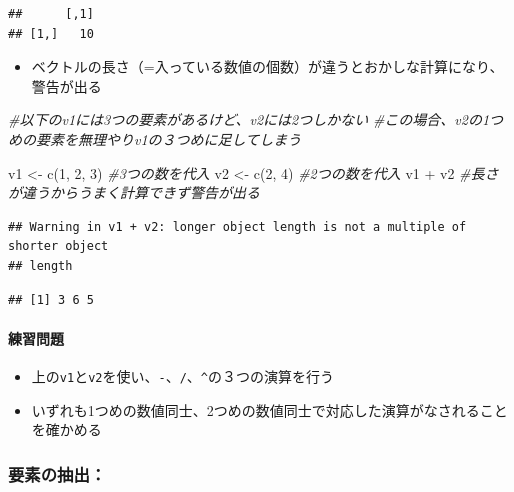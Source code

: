\documentclass[
]{book}
\newenvironment{Shaded}{\begin{snugshade}}{\end{snugshade}}
\newcommand{\CommentTok}[1]{\textcolor[rgb]{0.56,0.35,0.01}{\textit{#1}}}
\newcommand{\DecValTok}[1]{\textcolor[rgb]{0.00,0.00,0.81}{#1}}
\newcommand{\FunctionTok}[1]{\textcolor[rgb]{0.00,0.00,0.00}{#1}}
\newcommand{\NormalTok}[1]{#1}
\newcommand{\OtherTok}[1]{\textcolor[rgb]{0.56,0.35,0.01}{#1}}
\newcommand{\SpecialCharTok}[1]{\textcolor[rgb]{0.00,0.00,0.00}{#1}}
\providecommand{\tightlist}{%
  \setlength{\itemsep}{0pt}\setlength{\parskip}{0pt}}
\begin{document}
\begin{verbatim}
##      [,1]
## [1,]   10
\end{verbatim}

\begin{itemize}
\tightlist
\item
  ベクトルの長さ（=入っている数値の個数）が違うとおかしな計算になり、警告が出る
\end{itemize}

\begin{Shaded}
\begin{Highlighting}[]
\CommentTok{\#以下のv1には3つの要素があるけど、v2には2つしかない}
\CommentTok{\#この場合、v2の1つめの要素を無理やりv1の３つめに足してしまう}

\NormalTok{v1 }\OtherTok{\textless{}{-}} \FunctionTok{c}\NormalTok{(}\DecValTok{1}\NormalTok{, }\DecValTok{2}\NormalTok{, }\DecValTok{3}\NormalTok{)  }\CommentTok{\#3つの数を代入}
\NormalTok{v2 }\OtherTok{\textless{}{-}} \FunctionTok{c}\NormalTok{(}\DecValTok{2}\NormalTok{, }\DecValTok{4}\NormalTok{) }\CommentTok{\#2つの数を代入}
\NormalTok{v1 }\SpecialCharTok{+}\NormalTok{ v2 }\CommentTok{\#長さが違うからうまく計算できず警告が出る}
\end{Highlighting}
\end{Shaded}

\begin{verbatim}
## Warning in v1 + v2: longer object length is not a multiple of shorter object
## length
\end{verbatim}

\begin{verbatim}
## [1] 3 6 5
\end{verbatim}

\hypertarget{ux7df4ux7fd2ux554fux984c-1}{%
\paragraph*{練習問題}\label{ux7df4ux7fd2ux554fux984c-1}}

\begin{itemize}
\tightlist
\item
  上の\texttt{v1}と\texttt{v2}を使い、\texttt{-}、\texttt{/}、\texttt{\^{}}の３つの演算を行う
\item
  いずれも1つめの数値同士、2つめの数値同士で対応した演算がなされることを確かめる
\end{itemize}

\hypertarget{ux8981ux7d20ux306eux62bdux51fa}{%
\subsubsection*{要素の抽出：}\label{ux8981ux7d20ux306eux62bdux51fa}}
\end{document}
